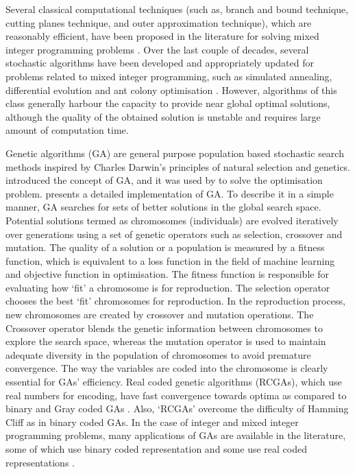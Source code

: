 Several classical computational techniques (such as, branch and bound technique, cutting planes technique, and outer approximation technique), which are reasonably efficient, have been proposed in the literature for solving mixed integer programming problems \citep{cooper1981survey, floudas1995nonlinear, grossmann2002review}. Over the last couple of decades, several stochastic algorithms have been developed and appropriately updated for problems related to mixed integer programming, such as simulated annealing, differential evolution and ant colony optimisation \citep{dorigo1996ant, babu2003differential, yiqing2007improved}. However, algorithms of this class generally harbour the capacity to provide near global optimal solutions, although the quality of the obtained solution is unstable and requires large amount of computation time.

Genetic algorithms (GA) are general purpose population based stochastic search methods inspired by Charles Darwin's principles of natural selection and genetics. \citet{holland1992adaptation} introduced the concept of GA, and it was used by \citet{kenneth1975analysis} to solve the optimisation problem. \citet{goldberg1989genetic} presents a detailed implementation of GA. To describe it in a simple manner, GA searches for sets of better solutions in the global search space. Potential solutions termed as chromosomes (individuals) are evolved iteratively over generations using a set of genetic operators such as selection, crossover and mutation. The quality of a solution or a population is measured by a fitness function, which is equivalent to a loss function in the field of machine learning and objective function in optimisation. The fitness function is responsible for evaluating how `fit' a chromosome is for reproduction. The selection operator chooses the best `fit' chromosomes for reproduction. In the reproduction process, new chromosomes are created by crossover and mutation operations. The Crossover operator blends the genetic information between chromosomes to explore the search space, whereas the mutation operator is used to maintain adequate diversity in the population of chromosomes to avoid premature convergence. The way the variables are coded into the chromosome is clearly essential for GAs' efficiency. Real coded genetic algorithms (RCGAs), which use real numbers for encoding, have fast convergence towards optima as compared to binary and Gray coded GAs \citep{deb2001multi,}. Also, `RCGAs' overcome the difficulty of Hamming Cliff
as in binary coded GAs. In the case of integer and mixed integer programming problems, many applications of GAs are available in the literature, some of which use binary coded representation \citep{cheung1997coupling, luo2001hybrid,hua2006effective} and some use real coded representations \citep{li1996nonlinear, yokota1996genetic, maiti2006application}.

